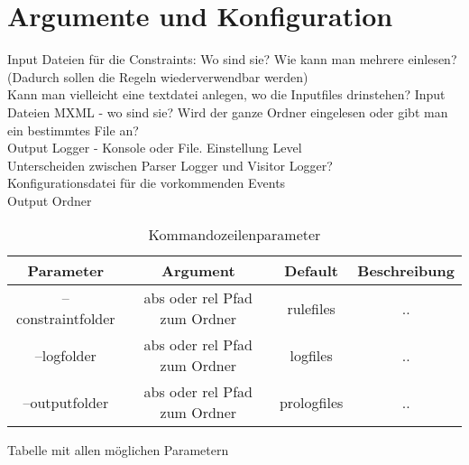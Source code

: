 
\chapter{Argumente und Konfiguration} %

\label{Argumente} %


Input Dateien für die Constraints: Wo sind sie? Wie kann man mehrere einlesen? (Dadurch sollen die Regeln wiederverwendbar werden)\\
Kann man vielleicht eine textdatei anlegen, wo die Inputfiles drinstehen?
Input Dateien MXML - wo sind sie? Wird der ganze Ordner eingelesen oder gibt man ein bestimmtes File an?\\
Output Logger  - Konsole oder File. Einstellung Level\\
Unterscheiden zwischen Parser Logger und Visitor Logger?\\
Konfigurationsdatei für die vorkommenden Events\\
Output Ordner

\begin{table}[h]
  \centering
  \begin{tabular}{|c|c|c|c|}
  Parameter & Argument & Default & Beschreibung\\
  \hline
  --constraintfolder & abs oder rel Pfad zum Ordner & rulefiles & ..\\
  --logfolder &abs oder rel Pfad zum Ordner & logfiles & ..\\
  --outputfolder &abs oder rel Pfad zum Ordner &prologfiles & ..\\
  \end{tabular}
 Tabelle mit allen möglichen Parametern
  \caption{Kommandozeilenparameter}
  \label{tab:commandlineargs}
\end{table}
